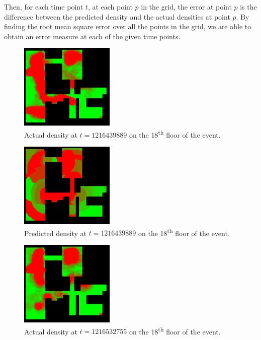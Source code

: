 \documentclass[letterpaper]{article}
\begin{document}
Then, for each time point $t$, at each point $p$ in the grid, the error at point $p$ is the difference between the predicted density and the actual densities at point $p$. By finding the root mean square error over all the points in the grid, we are able to obtain an error measure at each of the given time points.\\

\begin{figure}[h!]
  \centering
    \includegraphics[width=170px]{diagrams/26-27_86-83_59-49_1216439889_actual.png}
  \caption{Actual density at $t=1216439889$ on the 18\textsuperscript{th} floor of the event.}
  \label{fig:t1dist}
\end{figure}

\begin{figure}[h!]
  \centering
    \includegraphics[width=170px]{diagrams/26-27_86-83_59-49_1216439889_predicted.png}
  \caption{Predicted density at $t=1216439889$ on the 18\textsuperscript{th} floor of the event.}
  \label{fig:t2dist}
\end{figure}

\begin{figure}[h!]
  \centering
    \includegraphics[width=170px]{diagrams/26-27_86-83_59-49_1216532755_actual.png}
  \caption{Actual density at $t=1216532755$ on the 18\textsuperscript{th} floor of the event.}
  \label{fig:t3dist}
\end{figure}
\end{document}
